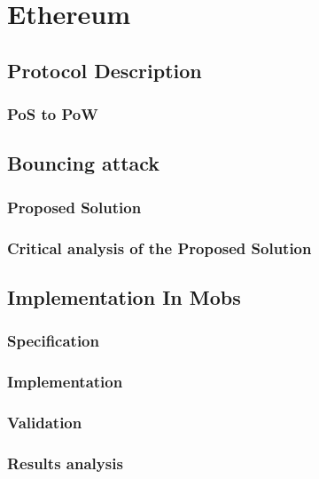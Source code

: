 
%

\chapter{Ethereum}\label{cha:ethereum}

\section{Protocol Description}\label{sub:protocol_description}

\subsection{PoS to PoW}\label{sub:pos_to_pow}

\section{Bouncing attack}\label{sub:bouncing_attack}

\subsection{Proposed Solution}\label{sub:proposed_patch}
\subsection{Critical analysis of the Proposed Solution}\label{sub:critical_analysis_of_the_proposed_patch}

\section{Implementation In Mobs}\label{sub:implementation_in_mobs}
\subsection{Specification}\label{sub:}
\subsection{Implementation}\label{sub:}
\subsection{Validation}\label{sub:}

\subsection{Results analysis}\label{sub:result_analysis}
